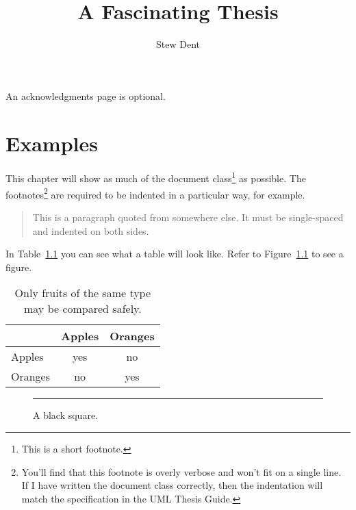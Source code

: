 \documentclass{umlthesis}
\title{A Fascinating Thesis}
\author{Stew Dent}
\begin{document}
\maketitle

\begin{acknowledgments}
An acknowledgments page is optional.
\end{acknowledgments}

\tableofcontents
\listoffigures
\listoftables

\chapter{Examples}
This chapter will show as much of the document class\footnote{This is a short footnote.} as possible. The footnotes\footnote{You'll find that this footnote is overly verbose and won't fit on a single line. If I have written the document class correctly, then the indentation will match the specification in the UML Thesis Guide.} are required to be indented in a particular way, for example.

\begin{quote}
  This is a paragraph quoted from somewhere else. It must be single-spaced and indented on both sides.
\end{quote}

In Table~\ref{tab:fruits} you can see what a table will look like. Refer to Figure~\ref{fig:square} to see a figure.

\begin{table}[h]
  \centering
  \caption[Comparison of fruits]{Only fruits of the same type may be compared safely.}
  \label{tab:fruits}
  \begin{tabular}{l|cc}
    & Apples & Oranges \\
    \hline
    Apples & yes & no \\
    Oranges & no & yes \\
  \end{tabular}
\end{table}

\lipsum[1]

\begin{figure}
  \centering
  \rule{2in}{2in}
  \caption{A black square.}
  \label{fig:square}
\end{figure}
\end{document}
